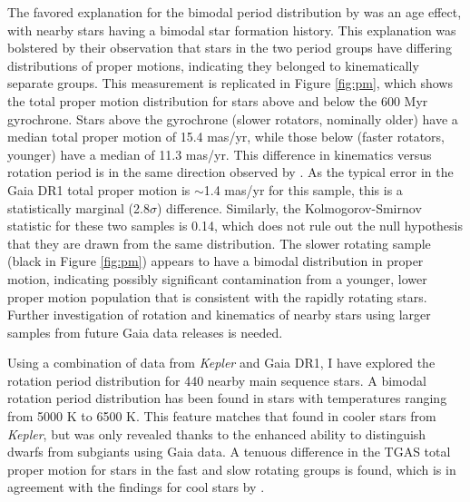 \documentclass[manuscript, letterpaper]{aastex6}
\makeatletter
\let\origsection\section
\renewcommand\section{\@ifstar{\starsection}{\nostarsection}}
\newcommand\nostarsection[1]{\sectionprelude\origsection{#1}}
\newcommand\starsection[1]{\sectionprelude\origsection*{#1}}
\newcommand\sectionprelude{\vspace{1em}}
\newcommand{\Kepler}{\textsl{Kepler}\xspace}
\makeatother
\begin{document}
The favored explanation for the bimodal period distribution by \citet{mcquillan2013} was an age effect, with nearby stars having a bimodal star formation history. This explanation was bolstered by their observation that stars in the two period groups have differing distributions of proper motions, indicating they belonged to kinematically separate groups. This measurement is replicated in Figure \ref{fig:pm}, which shows the total proper motion distribution for stars above and below the 600 Myr gyrochrone. Stars above the gyrochrone (slower rotators, nominally older) have a median total proper motion of 15.4 mas/yr, while those below (faster rotators, younger)  have a median of 11.3 mas/yr. This difference in kinematics versus rotation period is in the same direction observed by \citet{mcquillan2013}. As the typical error in the  Gaia DR1 total proper motion is $\sim$1.4 mas/yr for this sample, this is a statistically marginal (2.8$\sigma$) difference.  Similarly, the Kolmogorov-Smirnov statistic for these two samples is 0.14, which does not rule out the null hypothesis that they are drawn from the same distribution. The slower rotating sample (black in Figure \ref{fig:pm}) appears to have a bimodal distribution in proper motion, indicating possibly significant contamination from a younger, lower proper motion population that is consistent with the rapidly rotating stars. Further investigation of rotation and kinematics of nearby stars using larger samples from future Gaia data releases is needed.

\section{Discussion}

Using a combination of data from \Kepler and Gaia DR1, I have explored the rotation period distribution for 440 nearby main sequence stars. A bimodal rotation period distribution has been found in stars with temperatures ranging from 5000 K to 6500 K. This feature matches that found in cooler stars from \Kepler, but was only revealed thanks to the enhanced ability to distinguish dwarfs from subgiants using Gaia data. 
A tenuous difference in the TGAS total proper motion for stars in the fast and slow rotating groups is found, which is in agreement with the findings for cool stars by \citet{mcquillan2013}.
\end{document}

